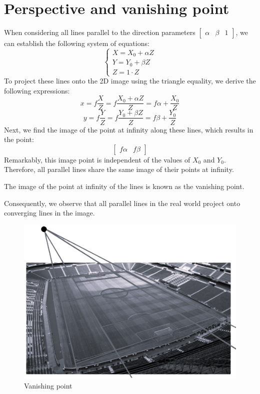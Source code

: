 \section{Perspective and vanishing point}

When considering all lines parallel to the direction parameters $\begin{bmatrix} \alpha & \beta & 1 \end{bmatrix}$, we can establish the following system of equations:
\[\begin{cases} X = X_0 + \alpha Z \\ Y = Y_0 + \beta Z \\ Z = 1 \cdot Z \end{cases}\]
To project these lines onto the 2D image using the triangle equality, we derive the following expressions:
\[x=f \dfrac{X}{Z} = f \dfrac{X_0 + \alpha Z}{Z} = f\alpha + \dfrac{X_0}{Z}\]
\[y=f \dfrac{Y}{Z} = f \dfrac{Y_0 + \beta Z}{Z}  = f\beta  + \dfrac{Y_0}{Z}\]
Next, we find the image of the point at infinity along these lines, which results in the point:
\[\begin{bmatrix} f\alpha & f\beta \end{bmatrix}\]
Remarkably, this image point is independent of the values of $X_0$ and $Y_0$. 
Therefore, all parallel lines share the same image of their points at infinity.
\begin{definition}
    The image of the point at infinity of the lines is known as the vanishing point. 
\end{definition}
Consequently, we observe that all parallel lines in the real world project onto converging lines in the image.
\begin{figure}[H]
    \centering
    \includegraphics[width=0.4\linewidth]{images/vanishingpoint.png}
    \caption{Vanishing point}
\end{figure}